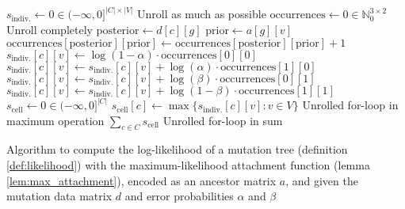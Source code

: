 \begin{algorithm}[p]
    \begin{algorithmic}
            \State $s_\mathrm{indiv.} \leftarrow 0 \in (-\infty,0]^{|C| \times |V|}$
             \Comment Unroll as much as possible
                \State $\mathrm{occurrences} \leftarrow 0 \in \mathbb{N}_0^{3 \times 2}$
                 \Comment Unroll completely
                    \State $\mathrm{posterior} \leftarrow d[c][g]$
                    \State $\mathrm{prior} \leftarrow a[g][v]$
                    \State $\mathrm{occurrences}[\mathrm{posterior}][\mathrm{prior}] \leftarrow \mathrm{occurrences}[\mathrm{posterior}][\mathrm{prior}] + 1$
                \EndFor
                \State $s_\mathrm{indiv.}[c][v] \leftarrow \log(1-\alpha) \cdot \mathrm{occurrences}[0][0]$
                \State $s_\mathrm{indiv.}[c][v] \leftarrow s_\mathrm{indiv.}[c][v] + \log(\alpha) \cdot \mathrm{occurrences}[1][0]$
                \State $s_\mathrm{indiv.}[c][v] \leftarrow s_\mathrm{indiv.}[c][v] + \log(\beta) \cdot \mathrm{occurrences}[0][1]$
                \State $s_\mathrm{indiv.}[c][v] \leftarrow s_\mathrm{indiv.}[c][v] + \log(1-\beta) \cdot \mathrm{occurrences}[1][1]$
            \EndFor
            \State $s_\mathrm{cell} \leftarrow 0 \in (-\infty,0]^{|C|}$
                \State $s_\mathrm{cell}[c] \leftarrow \max \{s_\mathrm{indiv.}[c][v] : v \in V\}$ \Comment Unrolled for-loop in maximum operation
            \EndFor
            \State \Return $\sum_{c \in C} s_\mathrm{cell}$ \Comment Unrolled for-loop in sum
        \EndFunction
    \end{algorithmic}
    \label{alg:likelihood}
    \caption{Algorithm to compute the log-likelihood of a mutation tree (definition \ref{def:likelihood}) with the maximum-likelihood attachment function (lemma \ref{lem:max_attachment}), encoded as an ancestor matrix $a$, and given the mutation data matrix $d$ and error probabilities $\alpha$ and $\beta$}
\end{algorithm}